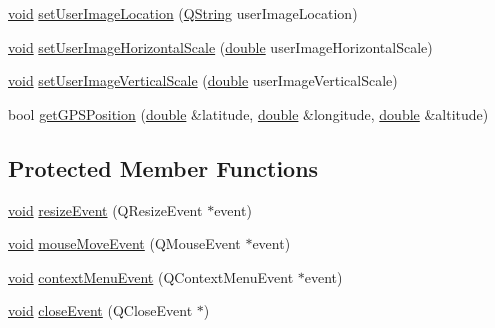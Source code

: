 \begin{DoxyCompactItemize}
\item 
\hyperlink{group___u_a_v_objects_plugin_ga444cf2ff3f0ecbe028adce838d373f5c}{void} \hyperlink{group___o_p_map_plugin_ga7afda7ed24be3606e25a6005fcc881da}{set\-User\-Image\-Location} (\hyperlink{group___u_a_v_objects_plugin_gab9d252f49c333c94a72f97ce3105a32d}{Q\-String} user\-Image\-Location)
\item 
\hyperlink{group___u_a_v_objects_plugin_ga444cf2ff3f0ecbe028adce838d373f5c}{void} \hyperlink{group___o_p_map_plugin_gab57277e52834ff73fe190391e3b2aa40}{set\-User\-Image\-Horizontal\-Scale} (\hyperlink{_super_l_u_support_8h_a8956b2b9f49bf918deed98379d159ca7}{double} user\-Image\-Horizontal\-Scale)
\item 
\hyperlink{group___u_a_v_objects_plugin_ga444cf2ff3f0ecbe028adce838d373f5c}{void} \hyperlink{group___o_p_map_plugin_gab9a1ad0c6a406ed144ba3ec120d94d28}{set\-User\-Image\-Vertical\-Scale} (\hyperlink{_super_l_u_support_8h_a8956b2b9f49bf918deed98379d159ca7}{double} user\-Image\-Vertical\-Scale)
\item 
bool \hyperlink{group___o_p_map_plugin_ga9d583efd0d407c4f509e812d454b41e0}{get\-G\-P\-S\-Position} (\hyperlink{_super_l_u_support_8h_a8956b2b9f49bf918deed98379d159ca7}{double} \&latitude, \hyperlink{_super_l_u_support_8h_a8956b2b9f49bf918deed98379d159ca7}{double} \&longitude, \hyperlink{_super_l_u_support_8h_a8956b2b9f49bf918deed98379d159ca7}{double} \&altitude)
\end{DoxyCompactItemize}
\subsection*{Protected Member Functions}
\begin{DoxyCompactItemize}
\item 
\hyperlink{group___u_a_v_objects_plugin_ga444cf2ff3f0ecbe028adce838d373f5c}{void} \hyperlink{group___o_p_map_plugin_ga5364db038789e0e4ad94ae0606391100}{resize\-Event} (Q\-Resize\-Event $\ast$event)
\item 
\hyperlink{group___u_a_v_objects_plugin_ga444cf2ff3f0ecbe028adce838d373f5c}{void} \hyperlink{group___o_p_map_plugin_gac0a4e19ec058721095f125dfba28ea79}{mouse\-Move\-Event} (Q\-Mouse\-Event $\ast$event)
\item 
\hyperlink{group___u_a_v_objects_plugin_ga444cf2ff3f0ecbe028adce838d373f5c}{void} \hyperlink{group___o_p_map_plugin_gab4575b0db17580cc1a575aafa2fc5710}{context\-Menu\-Event} (Q\-Context\-Menu\-Event $\ast$event)
\item 
\hyperlink{group___u_a_v_objects_plugin_ga444cf2ff3f0ecbe028adce838d373f5c}{void} \hyperlink{group___o_p_map_plugin_ga07f947001ed1fdf9d099f170e5116aa2}{close\-Event} (Q\-Close\-Event $\ast$)
\end{DoxyCompactItemize}


